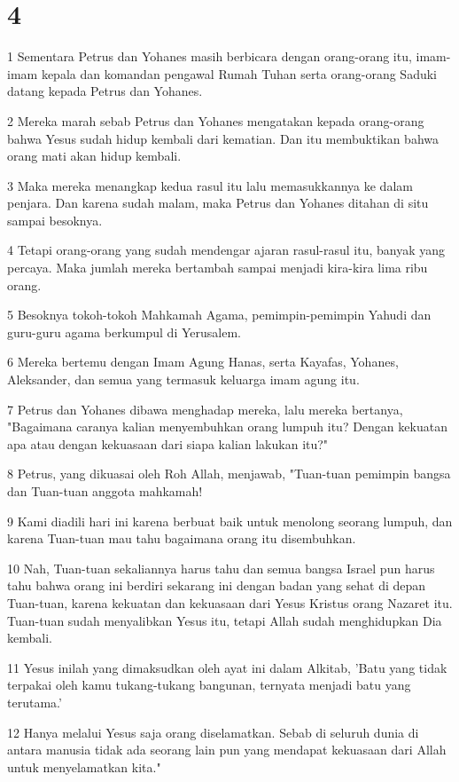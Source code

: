 \chapter{4}

\par 1 Sementara Petrus dan Yohanes masih berbicara dengan orang-orang itu, imam-imam kepala dan komandan pengawal Rumah Tuhan serta orang-orang Saduki datang kepada Petrus dan Yohanes.
\par 2 Mereka marah sebab Petrus dan Yohanes mengatakan kepada orang-orang bahwa Yesus sudah hidup kembali dari kematian. Dan itu membuktikan bahwa orang mati akan hidup kembali.
\par 3 Maka mereka menangkap kedua rasul itu lalu memasukkannya ke dalam penjara. Dan karena sudah malam, maka Petrus dan Yohanes ditahan di situ sampai besoknya.
\par 4 Tetapi orang-orang yang sudah mendengar ajaran rasul-rasul itu, banyak yang percaya. Maka jumlah mereka bertambah sampai menjadi kira-kira lima ribu orang.
\par 5 Besoknya tokoh-tokoh Mahkamah Agama, pemimpin-pemimpin Yahudi dan guru-guru agama berkumpul di Yerusalem.
\par 6 Mereka bertemu dengan Imam Agung Hanas, serta Kayafas, Yohanes, Aleksander, dan semua yang termasuk keluarga imam agung itu.
\par 7 Petrus dan Yohanes dibawa menghadap mereka, lalu mereka bertanya, "Bagaimana caranya kalian menyembuhkan orang lumpuh itu? Dengan kekuatan apa atau dengan kekuasaan dari siapa kalian lakukan itu?"
\par 8 Petrus, yang dikuasai oleh Roh Allah, menjawab, "Tuan-tuan pemimpin bangsa dan Tuan-tuan anggota mahkamah!
\par 9 Kami diadili hari ini karena berbuat baik untuk menolong seorang lumpuh, dan karena Tuan-tuan mau tahu bagaimana orang itu disembuhkan.
\par 10 Nah, Tuan-tuan sekaliannya harus tahu dan semua bangsa Israel pun harus tahu bahwa orang ini berdiri sekarang ini dengan badan yang sehat di depan Tuan-tuan, karena kekuatan dan kekuasaan dari Yesus Kristus orang Nazaret itu. Tuan-tuan sudah menyalibkan Yesus itu, tetapi Allah sudah menghidupkan Dia kembali.
\par 11 Yesus inilah yang dimaksudkan oleh ayat ini dalam Alkitab, 'Batu yang tidak terpakai oleh kamu tukang-tukang bangunan, ternyata menjadi batu yang terutama.'
\par 12 Hanya melalui Yesus saja orang diselamatkan. Sebab di seluruh dunia di antara manusia tidak ada seorang lain pun yang mendapat kekuasaan dari Allah untuk menyelamatkan kita."
